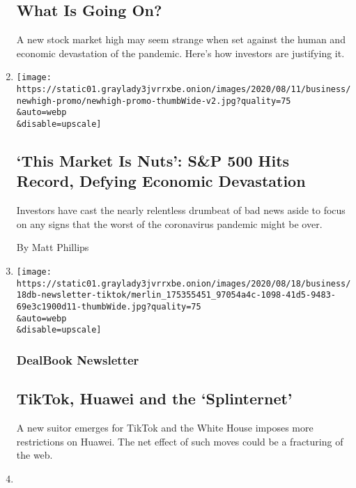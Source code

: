 \begin{enumerate}
  \hypertarget{what-is-going-on}{%
  \subsection{What Is Going On?}\label{what-is-going-on}}

  A new stock market high may seem strange when set against the human
  and economic devastation of the pandemic. Here's how investors are
  justifying it.
\item
  \href{/2020/08/18/business/stock-market-record.html}{}

  \texttt{[image: https://static01.graylady3jvrrxbe.onion/images/2020/08/11/business/newhigh-promo/newhigh-promo-thumbWide-v2.jpg?quality=75\\\&auto=webp\\\&disable=upscale]}

  \hypertarget{this-market-is-nuts-sp-500-hits-record-defying-economic-devastation}{%
  \subsection{`This Market Is Nuts': S\&P 500 Hits Record, Defying
  Economic
  Devastation}\label{this-market-is-nuts-sp-500-hits-record-defying-economic-devastation}}

  Investors have cast the nearly relentless drumbeat of bad news aside
  to focus on any signs that the worst of the coronavirus pandemic might
  be over.

  By Matt Phillips
\item
  \href{/2020/08/18/business/dealbook/tiktok-huawei-china.html}{}

  \texttt{[image: https://static01.graylady3jvrrxbe.onion/images/2020/08/18/business/18db-newsletter-tiktok/merlin\_175355451\_97054a4c-1098-41d5-9483-69e3c1900d11-thumbWide.jpg?quality=75\\\&auto=webp\\\&disable=upscale]}

  \hypertarget{dealbook-newsletter-2}{%
  \subsubsection{DealBook Newsletter}\label{dealbook-newsletter-2}}

  \hypertarget{tiktok-huawei-and-the-splinternet}{%
  \subsection{TikTok, Huawei and the
  `Splinternet'}\label{tiktok-huawei-and-the-splinternet}}

  A new suitor emerges for TikTok and the White House imposes more
  restrictions on Huawei. The net effect of such moves could be a
  fracturing of the web.
\item
  \href{/2020/08/18/technology/uber-lyft-franchise-california.html}{}


\end{enumerate}
